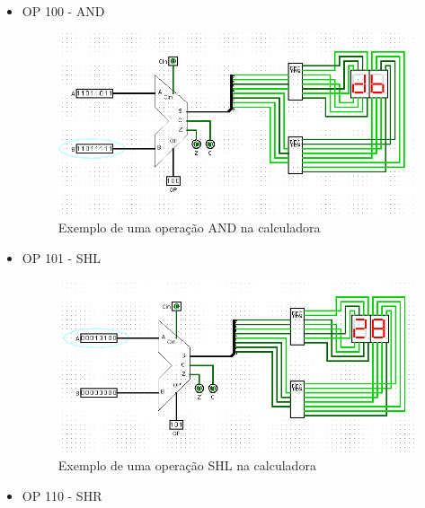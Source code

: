 \documentclass[
	12pt,				%
	openright,			%
	twoside,			%
	a4paper,			%
	english,			%
	french,				%
	spanish,			%
	brazil,				%
	]{abntex2}
\begin{document}
\begin{apendicesenv}
\begin{itemize}
\newpage
\item{OP 100 - AND}

\begin{figure}[H]
	\begin{center}
	    \includegraphics[scale=0.55]{calc100and.png}
	\end{center}
\caption{\label{calc100and}Exemplo de uma operação AND na calculadora}
\end{figure}

\item{OP 101 - SHL}

\begin{figure}[H]
	\begin{center}
	    \includegraphics[scale=0.55]{calc101shl.png}
	\end{center}
\caption{\label{calc101shl}Exemplo de uma operação SHL na calculadora}
\end{figure}

\newpage
\item{OP 110 - SHR}


\end{itemize}
\end{apendicesenv}
\end{document}
